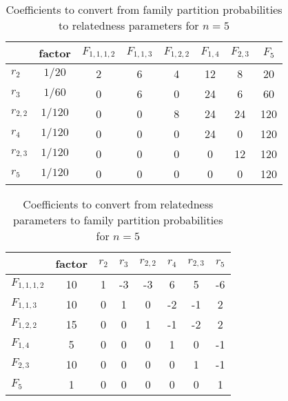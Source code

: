 \begin{table}[h]
\centering
\caption{Coefficients to convert from family partition probabilities to relatedness parameters for $n=5$}
\begin{tabular}{lccccccc}
\toprule
          &  factor &  $F_{1,1,1,2}$ &  $F_{1,1,3}$ &  $F_{1,2,2}$ &  $F_{1,4}$ &  $F_{2,3}$ &  $F_{5}$ \\
\midrule
  $r_{2}$ &  $1/20$ &              2 &            6 &            4 &         12 &          8 &       20 \\
  $r_{3}$ &  $1/60$ &              0 &            6 &            0 &         24 &          6 &       60 \\
$r_{2,2}$ & $1/120$ &              0 &            0 &            8 &         24 &         24 &      120 \\
  $r_{4}$ & $1/120$ &              0 &            0 &            0 &         24 &          0 &      120 \\
$r_{2,3}$ & $1/120$ &              0 &            0 &            0 &          0 &         12 &      120 \\
  $r_{5}$ & $1/120$ &              0 &            0 &            0 &          0 &          0 &      120 \\
\bottomrule
\end{tabular}
\end{table}

\begin{table}[h]
\centering
\caption{Coefficients to convert from relatedness parameters to family partition probabilities for $n=5$}
\begin{tabular}{lccccccc}
\toprule
              &  factor &  $r_{2}$ &  $r_{3}$ &  $r_{2,2}$ &  $r_{4}$ &  $r_{2,3}$ &  $r_{5}$ \\
\midrule
$F_{1,1,1,2}$ &      10 &        1 &       -3 &         -3 &        6 &          5 &       -6 \\
  $F_{1,1,3}$ &      10 &        0 &        1 &          0 &       -2 &         -1 &        2 \\
  $F_{1,2,2}$ &      15 &        0 &        0 &          1 &       -1 &         -2 &        2 \\
    $F_{1,4}$ &       5 &        0 &        0 &          0 &        1 &          0 &       -1 \\
    $F_{2,3}$ &      10 &        0 &        0 &          0 &        0 &          1 &       -1 \\
      $F_{5}$ &       1 &        0 &        0 &          0 &        0 &          0 &        1 \\
\bottomrule
\end{tabular}
\end{table}

